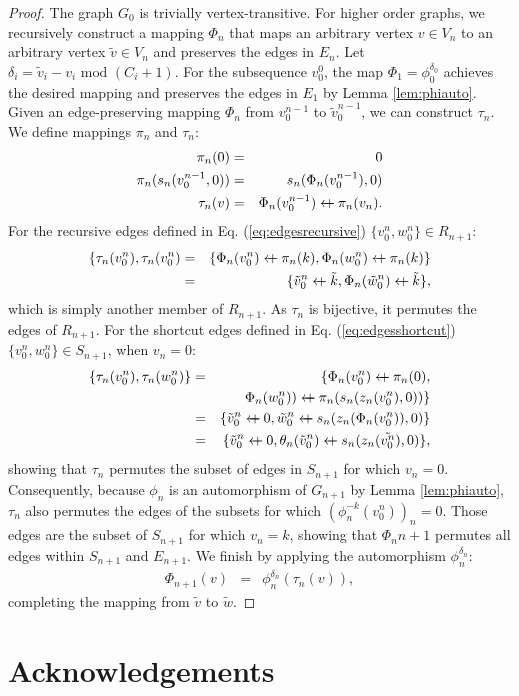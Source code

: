\documentclass{article}
\newcommand{\beq}{\begin{eqnarray}}
\newcommand{\eeq}{\end{eqnarray}}
\newcommand{\append}{\leftarrow{\mkern-18mu}{+}\:}
\begin{document}
\begin{proof}
The graph $G_0$ is trivially vertex-transitive.
For higher order graphs,
we recursively construct a mapping $\Phi_n$
that maps an arbitrary vertex $v \in V_n$ to
an arbitrary vertex $\tilde{v} \in V_n$ and preserves the edges in $E_n$.
Let $\delta_i = \tilde{v}_i - v_i \mbox{ mod } (C_i + 1)$.
For the subsequence $v_0^0$, the map $\Phi_1 = \phi_0^{\delta_0}$
achieves the desired mapping and preserves the edges in $E_1$ by
Lemma \ref{lem:phiauto}.
Given an edge-preserving mapping $\Phi_n$
from $v_0^{n-1}$ to $\tilde{v}_0^{n-1}$,
we can construct $\tau_{n}$.
We define mappings $\pi_n$ and $\tau_{n}$:
\beq
\pi_n(0) &=& 0
\\
\pi_n(s_n(v_0^{n-1}, 0))
&=& s_n(\Phi_n(v_0^{n-1}), 0)
\\
\tau_{n}(v)
&=& \Phi_{n}(v_0^{n-1}) \append \pi_n(v_n).
\eeq
For the recursive edges defined in Eq. (\ref{eq:edgesrecursive})
$\{v_0^n, w_0^n\} \in R_{n+1}$:
\beq
\{ \tau_{n}(v_0^n), \tau_{n}(v_0^n)
&=&
\{ \Phi_n(v_0^n) \append \pi_n(k), \Phi_n(w_0^n) \append \pi_n(k)\}
\\ &=&
\{ \tilde{v}_0^n \append \tilde{k}, \Phi_n(\tilde{w}_0^n) \append \tilde{k}\},
\eeq
which is simply another member of $R_{n+1}$.
As $\tau_{n}$ is bijective, it permutes the edges of $R_{n+1}$.
For the shortcut edges defined in Eq. (\ref{eq:edgesshortcut})
$\{v_0^n, w_0^n\} \in S_{n+1}$, when $v_n=0$:
\beq
\{\tau_{n}(v_0^n), \tau_{n}(w_0^n)\}
&=&
\{ \Phi_n(v_0^n) \append \pi_n(0),
\\ &&
\quad \Phi_n(w_0^n)) \append \pi_n(s_n(z_n(v_0^n), 0)) \}
\\ &=&
\{ \tilde{v}_0^n \append 0,
\tilde{w}_0^n \append s_n(z_n(\Phi_n(v_0^n)), 0) \}
\\ &=&
\{ \tilde{v}_0^n \append 0,
\theta_n(\tilde{v}_0^n) \append s_n(z_n(\tilde{v_0^n}), 0) \},
\eeq
showing that $\tau_{n}$ permutes the subset of edges in $S_{n+1}$ for which
$v_n=0$.
Consequently, because $\phi_n$ is an automorphism of $G_{n+1}$
by Lemma \ref{lem:phiauto}, $\tau_{n}$ also permutes the edges of the
subsets for which $(\phi_n^{-k}(v_0^n))_n=0$.
Those edges are the subset of $S_{n+1}$ for which $v_n=k$,
showing that $\Phi_n{n+1}$ permutes all edges within $S_{n+1}$ and
$E_{n+1}$.
We finish by applying the automorphism $\phi_n^{\delta_n}$:
\beq
\Phi_{n+1}(v) &=& \phi_n^{\delta_n}(\tau_{n}(v)),
\eeq
completing the mapping from $\tilde{v}$ to $\tilde{w}$.
\end{proof}
\section{Acknowledgements}


\end{document}

